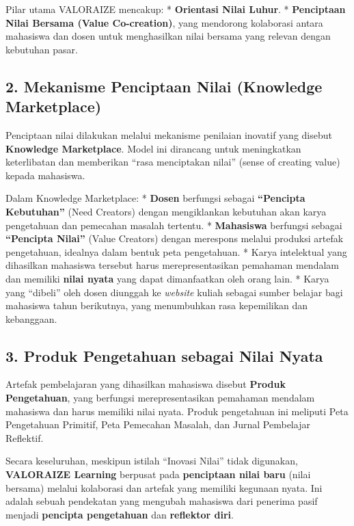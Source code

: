 \documentclass[
  letterpaper,
  DIV=11,
  numbers=noendperiod]{scrreprt}
\begin{document}
Pilar utama VALORAIZE mencakup: * \textbf{Orientasi Nilai Luhur}. *
\textbf{Penciptaan Nilai Bersama (Value Co-creation)}, yang mendorong
kolaborasi antara mahasiswa dan dosen untuk menghasilkan nilai bersama
yang relevan dengan kebutuhan pasar.

\subsection{2. Mekanisme Penciptaan Nilai (Knowledge
Marketplace)}\label{mekanisme-penciptaan-nilai-knowledge-marketplace}

Penciptaan nilai dilakukan melalui mekanisme penilaian inovatif yang
disebut \textbf{Knowledge Marketplace}. Model ini dirancang untuk
meningkatkan keterlibatan dan memberikan ``rasa menciptakan nilai''
(sense of creating value) kepada mahasiswa.

Dalam Knowledge Marketplace: * \textbf{Dosen} berfungsi sebagai
\textbf{``Pencipta Kebutuhan''} (Need Creators) dengan mengiklankan
kebutuhan akan karya pengetahuan dan pemecahan masalah tertentu. *
\textbf{Mahasiswa} berfungsi sebagai \textbf{``Pencipta Nilai''} (Value
Creators) dengan merespons melalui produksi artefak pengetahuan,
idealnya dalam bentuk peta pengetahuan. * Karya intelektual yang
dihasilkan mahasiswa tersebut harus merepresentasikan pemahaman mendalam
dan memiliki \textbf{nilai nyata} yang dapat dimanfaatkan oleh orang
lain. * Karya yang ``dibeli'' oleh dosen diunggah ke \emph{website}
kuliah sebagai sumber belajar bagi mahasiswa tahun berikutnya, yang
menumbuhkan rasa kepemilikan dan kebanggaan.

\subsection{3. Produk Pengetahuan sebagai Nilai
Nyata}\label{produk-pengetahuan-sebagai-nilai-nyata}

Artefak pembelajaran yang dihasilkan mahasiswa disebut \textbf{Produk
Pengetahuan}, yang berfungsi merepresentasikan pemahaman mendalam
mahasiswa dan harus memiliki nilai nyata. Produk pengetahuan ini
meliputi Peta Pengetahuan Primitif, Peta Pemecahan Masalah, dan Jurnal
Pembelajar Reflektif.

Secara keseluruhan, meskipun istilah ``Inovasi Nilai'' tidak digunakan,
\textbf{VALORAIZE Learning} berpusat pada \textbf{penciptaan nilai baru}
(nilai bersama) melalui kolaborasi dan artefak yang memiliki kegunaan
nyata. Ini adalah sebuah pendekatan yang mengubah mahasiswa dari
penerima pasif menjadi \textbf{pencipta pengetahuan} dan
\textbf{reflektor diri}.
\end{document}
